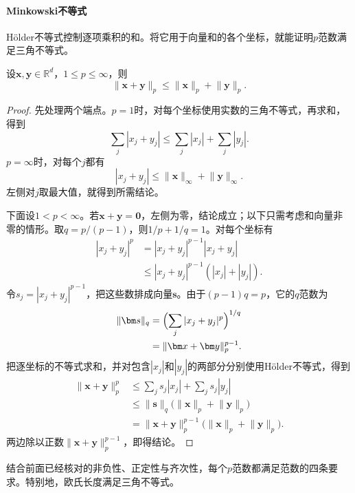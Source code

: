 \paragraph{Minkowski不等式}
Hölder不等式控制逐项乘积的和。将它用于向量和的各个坐标，就能证明$p$范数满足三角不等式。
\begin{theorem}[有限维Minkowski不等式]
\label{thm:linear-algebra-minkowski}
设$\bm x,\bm y\in\mathbb R^d$，$1\leq p\leq\infty$，则
\[
 \lVert\bm x+\bm y\rVert_p\leq\lVert\bm x\rVert_p+\lVert\bm y\rVert_p.
\]
\end{theorem}
\begin{proof}
先处理两个端点。$p=1$时，对每个坐标使用实数的三角不等式，再求和，得到
\[
 \sum_j|x_j+y_j|\leq\sum_j|x_j|+\sum_j|y_j|.
\]
$p=\infty$时，对每个$j$都有
\[
 |x_j+y_j|\leq\lVert\bm x\rVert_\infty+\lVert\bm y\rVert_\infty.
\]
左侧对$j$取最大值，就得到所需结论。

下面设$1<p<\infty$。若$\bm x+\bm y=\bm0$，左侧为零，结论成立；以下只需考虑和向量非零的情形。取$q=p/(p-1)$，则$1/p+1/q=1$。对每个坐标有
\[
 \begin{aligned}
 |x_j+y_j|^p
 &=|x_j+y_j|^{p-1}|x_j+y_j|\\
 &\leq |x_j+y_j|^{p-1}(|x_j|+|y_j|).
 \end{aligned}
\]
令$s_j=|x_j+y_j|^{p-1}$，把这些数排成向量$\bm s$。由于$(p-1)q=p$，它的$q$范数为
\[
 \begin{aligned}
 \lVert\bm s\rVert_q
 &=\Bigl(\sum_j|x_j+y_j|^p\Bigr)^{1/q}\\
 &=\lVert\bm x+\bm y\rVert_p^{p-1}.
 \end{aligned}
\]
把逐坐标的不等式求和，并对包含$|x_j|$和$|y_j|$的两部分分别使用Hölder不等式，得到
\[
 \begin{aligned}
 \lVert\bm x+\bm y\rVert_p^p
 &\leq\sum_js_j|x_j|+\sum_js_j|y_j|\\
 &\leq\lVert\bm s\rVert_q
       \bigl(\lVert\bm x\rVert_p+\lVert\bm y\rVert_p\bigr)\\
 &=\lVert\bm x+\bm y\rVert_p^{p-1}
       \bigl(\lVert\bm x\rVert_p+\lVert\bm y\rVert_p\bigr).
 \end{aligned}
\]
两边除以正数$\lVert\bm x+\bm y\rVert_p^{p-1}$，即得结论。
\end{proof}
结合前面已经核对的非负性、正定性与齐次性，每个$p$范数都满足范数的四条要求。特别地，欧氏长度满足三角不等式。

